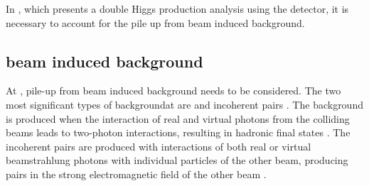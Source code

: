In , which presents a double Higgs production analysis using the \CLICILD detector, it is necessary to account for the pile up from beam induced background.





\subsection{\CLIC beam induced background}
\label{sec:pandoraggHad}


At \CLIC, pile-up from beam induced background needs to be considered. The two most significant types of backgroundat \CLIC are \ggHad and incoherent \ee pairs  \cite{Linssen:2012hp}. The \ggHad background is produced when the interaction of real and virtual  photons from the colliding beams leads to two-photon interactions, resulting in  hadronic final states \cite{Drees:1991zka, Chen:1993dba}. The incoherent \ee pairs are produced with interactions of both real or virtual beamstrahlung photons with individual particles of the other beam, producing \ee pairs in the strong electromagnetic field of the other beam \cite{Chen:1992ax}.

